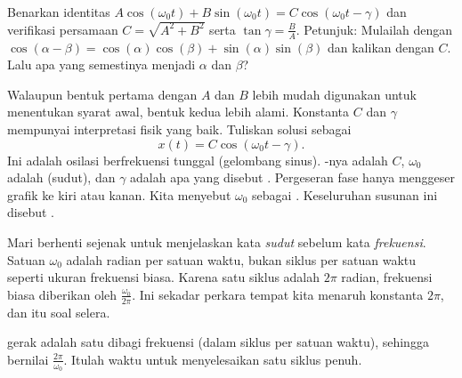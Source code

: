 \begin{exercise}
Benarkan identitas $A \cos (\omega_0 t) + B \sin (\omega_0 t) = C \cos ( \omega_0 t - \gamma )$ dan verifikasi persamaan $C = \sqrt{A^2+B^2}$ serta $\tan \gamma = \frac{B}{A}$. Petunjuk: Mulailah dengan $\cos (\alpha-\beta) = \cos (\alpha) \cos (\beta) + \sin (\alpha)\sin (\beta)$ dan kalikan dengan $C$. Lalu apa yang semestinya menjadi $\alpha$ dan $\beta$?
\end{exercise}

Walaupun bentuk pertama dengan $A$ dan $B$ lebih mudah digunakan untuk menentukan syarat awal, bentuk kedua lebih alami. Konstanta $C$ dan $\gamma$ mempunyai interpretasi fisik yang baik. Tuliskan solusi sebagai
\begin{equation*}
x(t) = C \cos ( \omega_0 t - \gamma ) .
\end{equation*}
Ini adalah osilasi berfrekuensi tunggal (gelombang sinus). \emph{}-nya adalah $C$, $\omega_0$ adalah \emph{} (sudut), dan $\gamma$ adalah apa yang disebut \emph{}. Pergeseran fase hanya menggeser grafik ke kiri atau kanan. Kita menyebut $\omega_0$ sebagai \emph{}. Keseluruhan susunan ini disebut \emph{}.

Mari berhenti sejenak untuk menjelaskan kata \emph{sudut} sebelum kata \emph{frekuensi}. Satuan $\omega_0$ adalah radian per satuan waktu, bukan siklus per satuan waktu seperti ukuran frekuensi biasa. Karena satu siklus adalah $2\pi$ radian, frekuensi biasa diberikan oleh $\frac{\omega_0}{2\pi}$. Ini sekadar perkara tempat kita menaruh konstanta $2\pi$, dan itu soal selera.

\emph{} gerak adalah satu dibagi frekuensi (dalam siklus per satuan waktu), sehingga bernilai $\frac{2\pi}{\omega_0}$. Itulah waktu untuk menyelesaikan satu siklus penuh.

